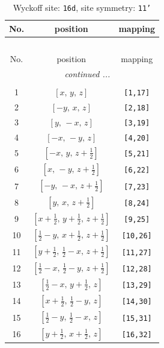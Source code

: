 \documentclass[fleqn,8pt]{jsarticle}
\begin{document}
\begin{longtable}{ccc}
\caption{Wyckoff site: {\tt 16d}, site symmetry: {\tt 11'}}
 \\
 \hline \hline
No. & position & mapping \\ \hline \endfirsthead

\multicolumn{2}{l}{\tablename\ \thetable{}} \\
 \hline \hline
No. & position & mapping \\ \hline \endhead

 \hline \hline
\multicolumn{2}{r}{\footnotesize\it continued ...} \\ \endfoot

 \hline \hline
\multicolumn{2}{r}{} \\ \endlastfoot

1 & $\left[ x,\, y,\, z \right]$ & {\tt [1,17]} \\ \hline
2 & $\left[ - y,\, x,\, z \right]$ & {\tt [2,18]} \\ \hline
3 & $\left[ y,\, - x,\, z \right]$ & {\tt [3,19]} \\ \hline
4 & $\left[ - x,\, - y,\, z \right]$ & {\tt [4,20]} \\ \hline
5 & $\left[ - x,\, y,\, z + \frac{1}{2} \right]$ & {\tt [5,21]} \\ \hline
6 & $\left[ x,\, - y,\, z + \frac{1}{2} \right]$ & {\tt [6,22]} \\ \hline
7 & $\left[ - y,\, - x,\, z + \frac{1}{2} \right]$ & {\tt [7,23]} \\ \hline
8 & $\left[ y,\, x,\, z + \frac{1}{2} \right]$ & {\tt [8,24]} \\ \hline
9 & $\left[ x + \frac{1}{2},\, y + \frac{1}{2},\, z + \frac{1}{2} \right]$ & {\tt [9,25]} \\ \hline
10 & $\left[ \frac{1}{2} - y,\, x + \frac{1}{2},\, z + \frac{1}{2} \right]$ & {\tt [10,26]} \\ \hline
11 & $\left[ y + \frac{1}{2},\, \frac{1}{2} - x,\, z + \frac{1}{2} \right]$ & {\tt [11,27]} \\ \hline
12 & $\left[ \frac{1}{2} - x,\, \frac{1}{2} - y,\, z + \frac{1}{2} \right]$ & {\tt [12,28]} \\ \hline
13 & $\left[ \frac{1}{2} - x,\, y + \frac{1}{2},\, z \right]$ & {\tt [13,29]} \\ \hline
14 & $\left[ x + \frac{1}{2},\, \frac{1}{2} - y,\, z \right]$ & {\tt [14,30]} \\ \hline
15 & $\left[ \frac{1}{2} - y,\, \frac{1}{2} - x,\, z \right]$ & {\tt [15,31]} \\ \hline
16 & $\left[ y + \frac{1}{2},\, x + \frac{1}{2},\, z \right]$ & {\tt [16,32]} \\
\end{longtable}
\end{document}
